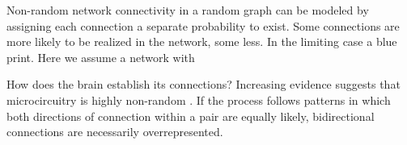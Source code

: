 Non-random network connectivity in a random graph can be modeled by assigning each connection a separate probability to exist. Some connections are more likely to be realized in the network, some less. In the limiting case a blue print. Here we assume a network with 

How does the brain establish its connections? Increasing evidence suggests that microcircuitry is highly non-random \cite{Song2005,Perin2011}. If the process follows patterns in which both directions of connection within a pair are equally likely, bidirectional connections are necessarily overrepresented.

